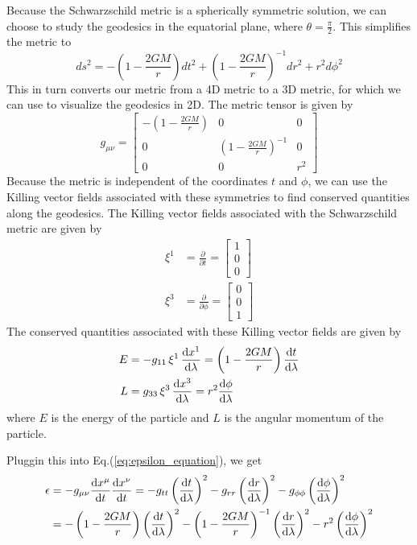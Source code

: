 \documentclass[12pt]{article}
\begin{document}
Because the Schwarzschild metric is a spherically symmetric solution, we can choose to study the geodesics in the equatorial plane, where \(\theta = \frac{\pi}{2}\).
This simplifies the metric to
\begin{equation}\label{eq:schwarzschild_metric_equatorial}
	ds^2 = -\left(1 - \frac{2GM}{r}\right) dt^2 + \left(1 - \frac{2GM}{r}\right)^{-1} dr^2 + r^2 d\phi^2
\end{equation}
This in turn converts our metric from a 4D metric to a 3D metric, for which we can use to visualize the geodesics in 2D.
The metric tensor is given by
\[
	g_{\mu\nu} = \begin{bmatrix}
	-\left(1 - \frac{2GM}{r}\right) & 0 & 0 \\
	0 & \left(1 - \frac{2GM}{r}\right)^{-1} & 0 \\
	0 & 0 & r^2
	\end{bmatrix}
\]
Because the metric is independent of the coordinates \(t\) and \(\phi\), we can use the Killing vector fields associated with these symmetries to find conserved quantities along the geodesics.
The Killing vector fields associated with the Schwarzschild metric are given by
\begin{align*}
	\xi^{1} &= \frac{\partial}{\partial t} = \begin{bmatrix} 1 \\ 0 \\ 0 \end{bmatrix} \\
	\xi^{3} &= \frac{\partial}{\partial \phi} = \begin{bmatrix} 0 \\ 0 \\ 1 \end{bmatrix}
\end{align*}
The conserved quantities associated with these Killing vector fields are given by
\begin{align}
	E &= -g_{11} \, \xi^{1} \, \dv{x^{1}}{\lambda} = \left(1 - \frac{2GM}{r}\right) \dv{t}{\lambda} \label{eq:energy} \\
	L &= g_{33} \, \xi^{3} \, \dv{x^{3}}{\lambda} = r^2 \dv{\phi}{\lambda} \label{eq:angular_momentum}
\end{align}
where \(E\) is the energy of the particle and \(L\) is the angular momentum of the particle.

Pluggin this into Eq.(\ref{eq:epsilon_equation}), we get
\begin{align*}
	\epsilon &= -g_{\mu\nu}\dv{x^{\mu}}{t}\dv{x^{\nu}}{t} = -g_{tt} \left(\dv{t}{\lambda}\right)^2 - g_{rr} \left(\dv{r}{\lambda}\right)^2 - g_{\phi\phi} \left(\dv{\phi}{\lambda}\right)^2 \\
	&= -\left(1 - \frac{2GM}{r}\right) \left(\dv{t}{\lambda}\right)^2 - \left(1 - \frac{2GM}{r}\right)^{-1} \left(\dv{r}{\lambda}\right)^2 - r^2 \left(\dv{\phi}{\lambda}\right)^2
\end{align*}
\end{document}
